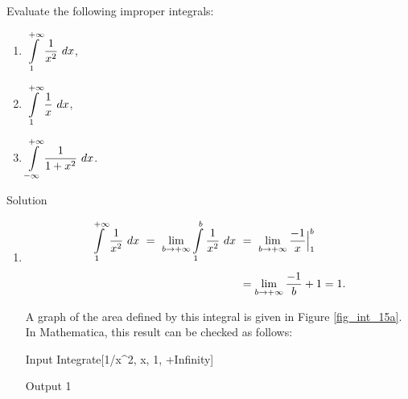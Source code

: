 \begin{example}\label{ex_impint1}
Evaluate the following improper integrals:

\begin{multicols}{3}
\begin{enumerate}
\item		$\displaystyle \int\limits_1^{+\infty} \frac1{x^2}\ dx$,
\item		$\displaystyle \int\limits_1^{+\infty} \frac1x\ dx$,
\item		$\displaystyle \int\limits_{-\infty}^{+\infty} \frac1{1+x^2}\ dx$.
\end{enumerate}
\end{multicols}


Solution 


\begin{enumerate}
\item		\hfill\allowdisplaybreaks\begin{align}[t] \ds \int\limits_1^{+\infty} \frac{1}{x^2}\ dx\  =\ \lim_{b\to+\infty} \ds \int\limits_1^b\frac1{x^2}\ dx\  &=\ \lim_{b\to+\infty} \frac{-1}{x}\Big|_1^b \\[0.2cm]
 &= \lim_{b\to+\infty} \frac{-1}{b} + 1=1.\end{align}\hfill\null

A graph of the area defined by this integral is given in Figure \ref{fig_int_15a}. 
\ifmathematica
In Mathematica, this result can be checked as follows: 
	\begin{mdframed}[default,backgroundcolor=gray!40,roundcorner=8pt]
\begin{mmaCell}[morefunctionlocal={x}]{Input}
  Integrate[1/x^2, {x, 1, +Infinity}]
\end{mmaCell}
\begin{mmaCell}{Output}
  1
\end{mmaCell}
\end{mdframed}
 \fi
 

\end{enumerate}
\end{example}
